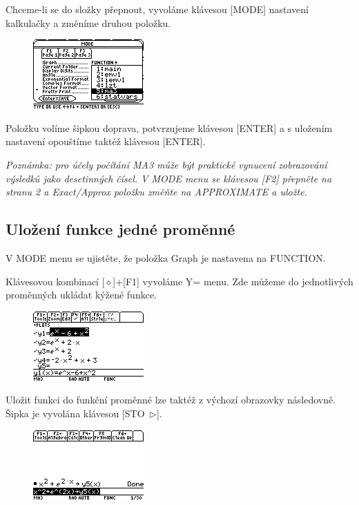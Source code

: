 \documentclass[10pt,a4paper,float]{article}
\begin{document}
Chceme-li se do složky přepnout, vyvoláme klávesou [MODE] nastavení kalkulačky a změníme druhou položku.

\begin{figure}[H]
	\centering
	\includegraphics[width=.5\textwidth]{img/CHANGEFOLDER}
\end{figure}

Položku volíme šipkou doprava, potvrzujeme klávesou [ENTER] a s uložením nastavení opouštíme taktéž klávesou [ENTER].

\textit{Poznámka: pro účely počítání MA3 může být praktické vynucení zobrazování výsledků jako desetinných čísel. V MODE menu se klávesou [F2] přepněte na stranu 2 a Exact/Approx položku změňte na APPROXIMATE a uložte.}

\pagebreak

\subsection{Uložení funkce jedné proměnné}
V MODE menu se ujistěte, že položka Graph je nastavena na FUNCTION.

Klávesovou kombinací [$\diamond$]+[F1] vyvoláme Y= menu. Zde můžeme do jednotlivých proměnných ukládat kýžené funkce.

\begin{figure}[H]
	\centering
	\includegraphics[width=.5\textwidth]{img/1FUNC}
\end{figure}

Uložit funkci do funkční proměnné lze taktéž z výchozí obrazovky následovně. Šipka je vyvolána klávesou [STO~$\triangleright$].

\begin{figure}[H]
	\centering
	\includegraphics[width=.5\textwidth]{img/1FUNC_ULOZ}
\end{figure}
\end{document}
